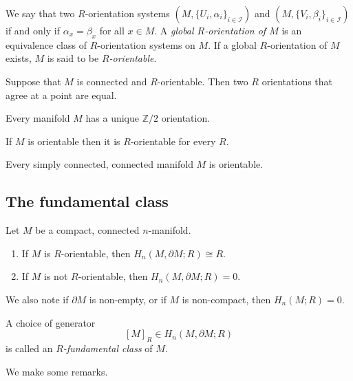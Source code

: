We say that two $R$-orientation systems $(M, \{U_i, \alpha_i\}_{i \in \mathcal I})$ and $(M, \{V_i, \beta_i\}_{i \in \mathcal I})$ if and only if $\alpha_x = \beta_x$ for all $x \in M$. A \emph{global $R$-orientation of $M$} is an equivalence class of $R$-orientation systems on $M$. If a global $R$-orientation of $M$ exists, $M$ is said to be \emph{$R$-orientable}.

\begin{proposition}
    Suppose that $M$ is connected and $R$-orientable. Then two $R$ orientations that agree at a point are equal.
\end{proposition}

\begin{proposition}
    Every manifold $M$ has a unique $\mathbb Z/2$ orientation.
\end{proposition}

\begin{proposition}
    If $M$ is orientable then it is $R$-orientable for every $R$.
\end{proposition}

\begin{proposition}
    Every simply connected, connected manifold $M$ is orientable.
\end{proposition}

\subsection{The fundamental class}

\begin{theorem}
    Let $M$ be a compact, connected $n$-manifold.
    \begin{enumerate}
        \item If $M$ is $R$-orientable, then $H_n(M, \partial M; R) \cong R$.
        \item If $M$ is not $R$-orientable, then $H_n(M, \partial M; R) = 0$.
    \end{enumerate}
\end{theorem}

We also note if $\partial M$ is non-empty, or if $M$ is non-compact, then $H_n(M; R) = 0$.

\begin{definition}
    A choice of generator
    \[ [M]_R \in H_n(M, \partial M; R) \]
    is called an \emph{$R$-fundamental class} of $M$.
\end{definition}

We make some remarks.

